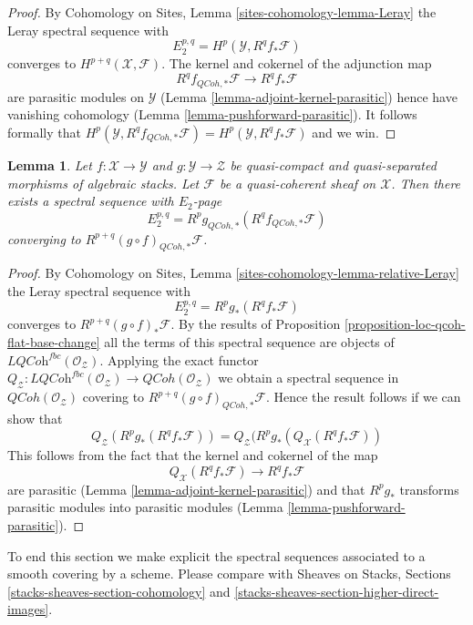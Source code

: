 \documentclass{stacks-project}
\theoremstyle{plain}
\newtheorem{lemma}[subsection]{Lemma}
\theoremstyle{definition}
\theoremstyle{remark}
\numberwithin{equation}{subsection}
\def\QCoh{\mathit{QCoh}}
\begin{document}
\begin{proof}
By Cohomology on Sites, Lemma \ref{sites-cohomology-lemma-Leray}
the Leray spectral sequence with
$$
E_2^{p, q} = H^p(\mathcal{Y}, R^qf_*\mathcal{F})
$$
converges to $H^{p + q}(\mathcal{X}, \mathcal{F})$. The kernel and cokernel
of the adjunction map
$$
R^qf_{\QCoh, *}\mathcal{F} \longrightarrow R^qf_*\mathcal{F}
$$
are parasitic modules on $\mathcal{Y}$
(Lemma \ref{lemma-adjoint-kernel-parasitic})
hence have vanishing cohomology
(Lemma \ref{lemma-pushforward-parasitic}).
It follows formally that
$H^p(\mathcal{Y}, R^qf_{\QCoh, *}\mathcal{F}) =
H^p(\mathcal{Y}, R^qf_*\mathcal{F})$ and we win.
\end{proof}

\begin{lemma}
\label{lemma-relative-leray}
Let $f : \mathcal{X} \to \mathcal{Y}$ and $g : \mathcal{Y} \to \mathcal{Z}$
be quasi-compact and quasi-separated morphisms of algebraic stacks.
Let $\mathcal{F}$ be a quasi-coherent sheaf on $\mathcal{X}$. Then
there exists a spectral sequence with $E_2$-page
$$
E_2^{p, q} = R^pg_{\QCoh, *}(R^qf_{\QCoh, *}\mathcal{F})
$$
converging to $R^{p + q}(g \circ f)_{\QCoh, *}\mathcal{F}$.
\end{lemma}

\begin{proof}
By Cohomology on Sites, Lemma \ref{sites-cohomology-lemma-relative-Leray}
the Leray spectral sequence with
$$
E_2^{p, q} = R^pg_*(R^qf_*\mathcal{F})
$$
converges to $R^{p + q}(g \circ f)_*\mathcal{F}$. By the results of
Proposition \ref{proposition-loc-qcoh-flat-base-change}
all the terms of this spectral sequence are objects of
$\textit{LQCoh}^{fbc}(\mathcal{O}_\mathcal{Z})$. Applying the exact functor
$Q_\mathcal{Z} : \textit{LQCoh}^{fbc}(\mathcal{O}_\mathcal{Z}) \to
\QCoh(\mathcal{O}_\mathcal{Z})$ we obtain a spectral sequence in
$\QCoh(\mathcal{O}_\mathcal{Z})$ covering to
$R^{p + q}(g \circ f)_{\QCoh, *}\mathcal{F}$. Hence
the result follows if we can show that
$$
Q_\mathcal{Z}(R^pg_*(R^qf_*\mathcal{F})) =
Q_\mathcal{Z}(R^pg_*(Q_\mathcal{X}(R^qf_*\mathcal{F}))
$$
This follows from the fact that the kernel and cokernel of the map
$$
Q_\mathcal{X}(R^qf_*\mathcal{F}) \longrightarrow R^qf_*\mathcal{F}
$$
are parasitic (Lemma \ref{lemma-adjoint-kernel-parasitic}) and that
$R^pg_*$ transforms parasitic modules into parasitic modules
(Lemma \ref{lemma-pushforward-parasitic}).
\end{proof}

\noindent
To end this section we make explicit the spectral sequences
associated to a smooth covering by a scheme. Please compare with
Sheaves on Stacks, Sections \ref{stacks-sheaves-section-cohomology} and
\ref{stacks-sheaves-section-higher-direct-images}.
\end{document}

